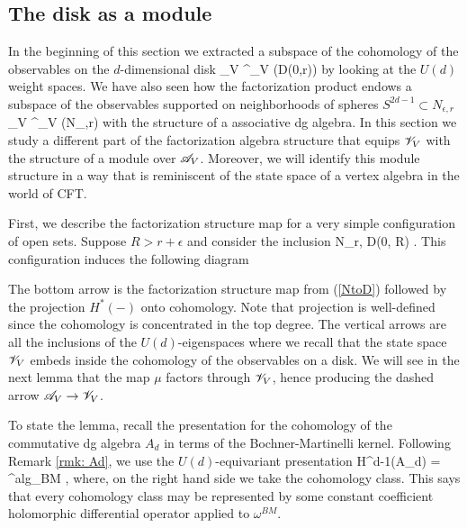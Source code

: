 \subsection{The disk as a module}\label{sec: disk module}
In the beginning of this section we extracted a subspace of the cohomology of the observables on the $d$-dimensional disk 
\ben
\sV_V \subset \Obs^{\q}_{V} (D(0,r))
\een
by looking at the $U(d)$ weight spaces. 
We have also seen how the factorization product endows a subspace of the observables supported on neighborhoods of spheres $S^{2d-1} \subset N_{\epsilon, r}$
\ben
\sA_V \subset \Obs^\q_V (N_{\epsilon,r})
\een
with the structure of a associative dg algebra.
In this section we study a different part of the factorization algebra structure that equips $\mathscr V_V$ with the structure of a module over $\mathscr A_V$. 
Moreover, we will identify this module structure in a way that is reminiscent of the state space of a vertex algebra in the world of CFT.

First, we describe the factorization structure map for a very simple configuration of open sets. 
Suppose $R > r + \epsilon$ and consider the inclusion 
\be\label{NtoD}
N_{r,\epsilon} \hookrightarrow D(0, R) .
\ee
This configuration induces the following diagram
\be\label{composition1}
\ee
The bottom arrow is the factorization structure map from (\ref{NtoD}) followed by the projection $H^*(-)$ onto cohomology.
Note that projection is well-defined since the cohomology is concentrated in the top degree. 
The vertical arrows are all the inclusions of the $U(d)$-eigenspaces where we recall that the state space $\mathscr V_V$ embeds inside the cohomology of the observables on a disk.
We will see in the next lemma that the map $\mu$ factors through $\mathscr V_V$, hence producing the dashed arrow $\mathscr A_V \to \mathscr V_V$.

To state the lemma, recall the presentation for the cohomology of the commutative dg algebra $A_d$ in terms of the Bochner-Martinelli kernel.
Following Remark \ref{rmk: Ad}, we use the $U(d)$-equivariant presentation
\ben
H^{d-1}(A_d) = \CC{} \omega^{alg}_{BM} ,
\een
where, on the right hand side we take the cohomology class.
This says that every cohomology class may be represented by some constant coefficient holomorphic differential operator applied to $\omega^{BM}$.

